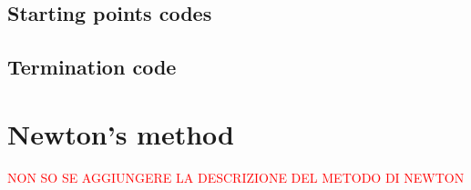 \documentclass[a4paper,10 pt,titlepage,twoside]{book}
\theoremstyle{plain}
\theoremstyle{definition}
\theoremstyle{remark}
\begin{document}
\section*{Starting points codes}
 
 
\section*{Termination code}
 
	\chapter*{Newton's method}
	\textcolor{red}{NON SO SE AGGIUNGERE LA DESCRIZIONE DEL METODO DI NEWTON}\\
\end{document}
